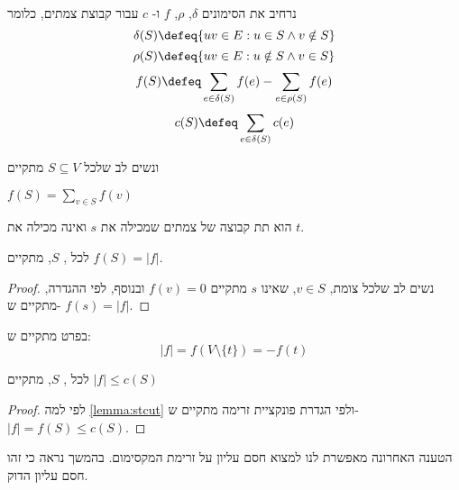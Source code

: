נרחיב את הסימונים 
$\delta$, $\rho$, $f$
ו-%
$c$
עבור קבוצת צמתים, כלומר
$$\delta(S) \defeq \{uv \in E : u \in S \land v \notin S\}$$
$$\rho(S) \defeq \{uv \in E : u \notin S \land v \in S\}$$
$$f(S) \defeq \sum_{e \in \delta(S)} f(e) - \sum_{e \in \rho(S)} f(e)$$
$$c(S) \defeq \sum_{e \in \delta(S)} c(e)$$

ונשים לב שלכל 
$S \subseteq V$
מתקיים
\begin{observation}
$f(S) = \sum_{v \in S} f(v)$
\end{observation}

\begin{definition}[\stcut]
\stcut{}
הוא תת קבוצה של צמתים שמכילה את $s$ ואינה מכילה את $t$.
\end{definition}

\begin{lemma}
\label{lemma:stcut}
לכל
\stcut, $S$,
מתקיים
$f(S) = |f|$.
\end{lemma}

\begin{proof}
נשים לב שלכל צומת, 
$v \in S$,
שאינו $s$ מתקיים 
$f(v) = 0$
ובנוסף, לפי ההגדרה, מתקיים ש-%
$f(s) = |f|$.
\end{proof}

בפרט מתקיים ש:%
$$
|f| = f(V \setminus \{t\}) = -f(t)
$$

\begin{claim}
\label{claim:upper}
לכל 
\stcut, $S$,
מתקיים
$|f| \leq c(S)$
\end{claim}

\begin{proof}
לפי למה
\ref{lemma:stcut}
ולפי הגדרת פונקציית זרימה מתקיים ש-%
$|f| = f(S) \leq c(S)$.
\end{proof}

הטענה האחרונה מאפשרת לנו למצוא חסם עליון על זרימת המקסימום.
בהמשך נראה כי זהו חסם עליון הדוק.
